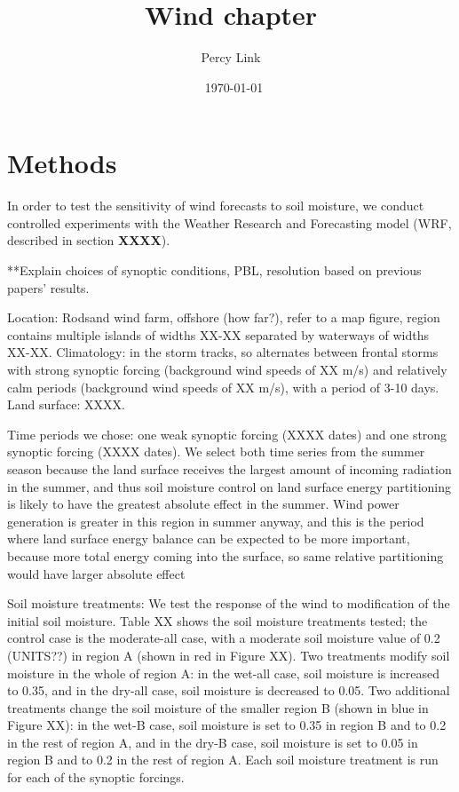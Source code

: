 \documentclass[12pt]{amsart}
\title{Wind chapter}
\author{Percy Link}
\date{\currenttime \ \today} %
\begin{document}
\maketitle

\section{Methods}
In order to test the sensitivity of wind forecasts to soil moisture, we conduct controlled experiments with the Weather Research and Forecasting model (WRF, described in section \textbf{XXXX}).

**Explain choices of synoptic conditions, PBL, resolution based on previous papers' results.

Location: Rodsand wind farm, offshore (how far?), refer to a map figure, region contains multiple islands of widths XX-XX separated by waterways of widths XX-XX.  Climatology: in the storm tracks, so alternates between frontal storms with strong synoptic forcing (background wind speeds of XX m/s) and relatively calm periods (background wind speeds of XX m/s), with a period of 3-10 days.  Land surface: XXXX.

Time periods we chose: one weak synoptic forcing (XXXX dates) and one strong synoptic forcing (XXXX dates).  We select both time series from the summer season because the land surface receives the largest amount of incoming radiation in the summer, and thus soil moisture control on land surface energy partitioning is likely to have the greatest absolute effect in the summer.
Wind power generation is greater in this region in summer anyway, and this is the period where land surface energy balance can be expected to be more important, because more total energy coming into the surface, so same relative partitioning would have larger absolute effect

Soil moisture treatments: We test the response of the wind to modification of the initial soil moisture.  Table XX shows the soil moisture treatments tested; the control case is the moderate-all case, with a moderate soil moisture value of 0.2 (UNITS??) in region A (shown in red in Figure XX).  Two treatments modify soil moisture in the whole of region A: in the wet-all case, soil moisture is increased to 0.35, and in the dry-all case, soil moisture is decreased to 0.05.  Two additional treatments change the soil moisture of the smaller region B (shown in blue in Figure XX): in the wet-B case, soil moisture is set to 0.35 in region B and to 0.2 in the rest of region A, and in the dry-B case, soil moisture is set to 0.05 in region B and to 0.2 in the rest of region A.  Each soil moisture treatment is run for each of the synoptic forcings.
\end{document}
